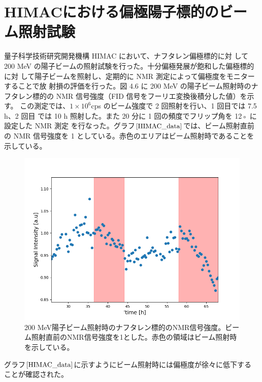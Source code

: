 \section{HIMACにおける偏極陽子標的のビーム照射試験}
量子科学技術研究開発機構 HIMAC において、ナフタレン偏極標的に対
して 200 MeV の陽子ビームの照射試験を行った。十分偏極発展が飽和した偏極標的に対
して陽子ビームを照射し、定期的に NMR 測定によって偏極度をモニターすることで放
射損の評価を行った。図 4.6 に 200 MeV の陽子ビーム照射時のナフタレン標的の
NMR 信号強度（FID 信号をフーリエ変換後積分した値）を示す。
この測定では、$1\times10^6$cps のビーム強度で 2 回照射を行い、1 回目では 7.5 h、2 回目
では 10 h 照射した。また 20 分に 1 回の頻度でフリップ角を 12◦ に設定した NMR 測定
を行なった。グラフ$\ref{HIMAC_data}$では、ビーム照射直前の NMR
信号強度を 1 としている。赤色のエリアはビーム照射時であることを示している。
\begin{figure}[ht]
  \centering
  \includegraphics[keepaspectratio, scale=0.7]
       {./chap2/fig/HIMAC_data.png}
  \caption{200 MeV陽子ビーム照射時のナフタレン標的のNMR信号強度。ビーム照射直前のNMR信号強度を1とした。赤色の領域はビーム照射時を示している。}
  \label{HIMAC_data}
 \end{figure}

 グラフ$\ref{HIMAC_data}$に示すようにビーム照射時には偏極度が徐々に低下する
 ことが確認された。

 




